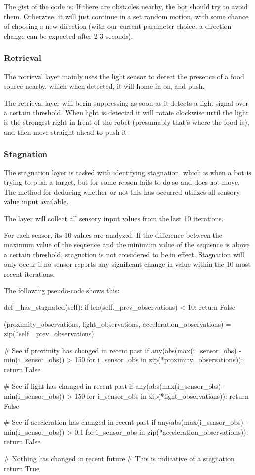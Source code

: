 \documentclass[a4paper,10pt]{article}
\newcommand{\tickspersecond}{10}
\begin{document}
The gist of the code is: If there are obstacles nearby, the bot should try
to avoid them. Otherwise, it will just continue in a set random motion, with
some chance of choosing a new direction (with our current parameter choice, a
direction change can be expected after 2-3 seconds). 

\subsubsection{Retrieval}
The retrieval layer mainly uses the light sensor to detect the presence of a
food source nearby, which when detected, it will home in on, and push.

The retrieval layer will begin suppressing as soon as it detects a light
signal over a certain threshold. When light is detected it will rotate clockwise until 
the light is the strongest right in front of the robot (presumably that's where 
the food is), and then move straight ahead to push it.

\subsubsection{Stagnation}
The stagnation layer is tasked with identifying stagnation, which is when a 
bot is trying to push a target, but for some reason fails to do so and does 
not move. The method for deducing whether or not this has occurred utilizes 
all sensory value input available.

The layer will collect all sensory input values from the last 
{\tickspersecond} iterations.  

For each sensor, its {\tickspersecond} values are analyzed. If the difference 
between the maximum value of the sequence and the minimum value of the 
sequence is above a certain threshold, stagnation is not considered to be in 
effect. Stagnation will only occur if no sensor reports any significant change 
in value within the {\tickspersecond} most recent iterations.

The following pseudo-code shows this:

\begin{python}
def _has_stagnated(self):
    if len(self._prev_observations) < 10:
        return False

    (proximity_observations,
     light_observations,
     acceleration_observations) = zip(*self._prev_observations)

    # See if proximity has changed in recent past
    if any(abs(max(i_sensor_obs) - min(i_sensor_obs)) > 150
           for i_sensor_obs in zip(*proximity_observations)):
        return False

    # See if light has changed in recent past
    if any(abs(max(i_sensor_obs) - min(i_sensor_obs)) > 150
           for i_sensor_obs in zip(*light_observations)):
        return False

    # See if acceleration has changed in recent past
    if any(abs(max(i_sensor_obs) - min(i_sensor_obs)) > 0.1
           for i_sensor_obs in zip(*acceleration_observations)):
        return False

    # Nothing has changed in recent future
    # This is indicative of a stagnation
    return True
\end{python}
\end{document}

